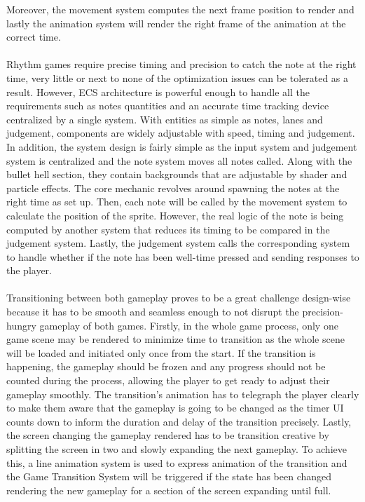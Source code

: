 Moreover, the movement system computes the next frame position to render and lastly the animation system will render the right frame of the animation at the correct time.
\\\\
Rhythm games require precise timing and precision to catch the note at the right time,
very little or next to none of the optimization issues can be tolerated as a result.
However, ECS architecture is powerful enough to handle all the requirements
such as notes quantities and an accurate time tracking device centralized by a single system.
With entities as simple as notes, lanes and judgement, components are widely adjustable with speed, timing and judgement.
In addition, the system design is fairly simple as the input system and judgement system is centralized and the note system moves all notes called.
Along with the bullet hell section, they contain backgrounds that are adjustable by shader and particle effects.
The core mechanic revolves around spawning the notes at the right time as set up.
Then, each note will be called by the movement system to calculate the position of the sprite.
However, the real logic of the note is being computed by another system that reduces its timing to be compared in the judgement system.
Lastly, the judgement system calls the corresponding system to handle whether if the note has been well-time pressed and sending responses to the player.
\\\\
Transitioning between both gameplay proves to be a great challenge design-wise
because it has to be smooth and seamless enough to not disrupt the precision-hungry gameplay of both games.
Firstly, in the whole game process, only one game scene may be rendered to minimize time to transition
as the whole scene will be loaded and initiated only once from the start.
If the transition is happening, the gameplay should be frozen and any progress should not be counted during the process,
allowing the player to get ready to adjust their gameplay smoothly.
The transition's animation has to telegraph the player clearly to make them aware that the gameplay is going to be changed
as the timer UI counts down to inform the duration and delay of the transition precisely.
Lastly, the screen changing the gameplay rendered has to be transition creative by splitting the screen in two and slowly expanding the next gameplay.
To achieve this, a line animation system is used to express animation of the transition
and the Game Transition System will be triggered if the state has been changed rendering the new gameplay for a section of the screen expanding until full.

